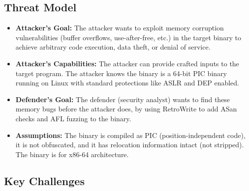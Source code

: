 \documentclass[10pt,a4paper]{article}
\begin{document}
\subsection{Threat Model}

\begin{itemize}
    \item \textbf{Attacker's Goal:} The attacker wants to exploit memory corruption vulnerabilities (buffer overflows, use-after-free, etc.) in the target binary to achieve arbitrary code execution, data theft, or denial of service.

    \item \textbf{Attacker's Capabilities:} The attacker can provide crafted inputs to the target program. The attacker knows the binary is a 64-bit PIC binary running on Linux with standard protections like ASLR and DEP enabled.

    \item \textbf{Defender's Goal:} The defender (security analyst) wants to find these memory bugs before the attacker does, by using RetroWrite to add ASan checks and AFL fuzzing to the binary.

    \item \textbf{Assumptions:} The binary is compiled as PIC (position-independent code), it is not obfuscated, and it has relocation information intact (not stripped). The binary is for x86-64 architecture.
\end{itemize}

\subsection{Key Challenges}
\end{document}

